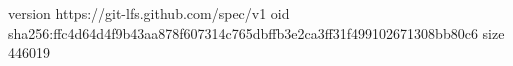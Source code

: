 version https://git-lfs.github.com/spec/v1
oid sha256:ffc4d64d4f9b43aa878f607314c765dbffb3e2ca3ff31f499102671308bb80c6
size 446019
